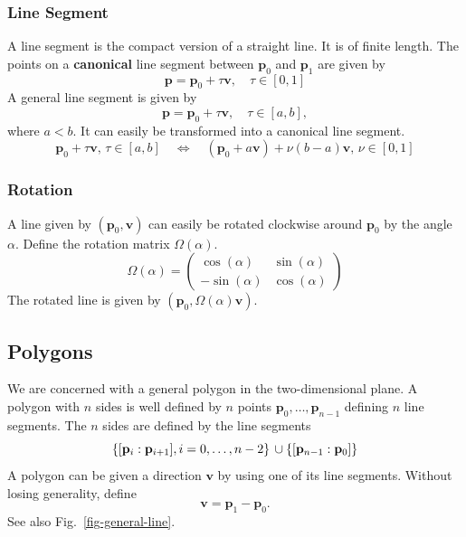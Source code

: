 \documentclass[11pt]{article}
\newcommand{\pb}{\mathbf{p}}
\newcommand{\vb}{\mathbf{v}}
\newcommand{\figref}[1]{Fig.~\eqref{#1}}
\begin{document}
\subsubsection{Line Segment}
\label{sec-line-segment}
A line segment is the compact version of a straight line. It is of finite
length. The points on a {\bf canonical} line segment between $\pb_0$ and
$\pb_1$ are given by
\begin{equation}
    \pb=\pb_0 + \tau \vb,\quad \tau\in[0,1] \label{eq-line-canonical}
\end{equation}
A general line segment is given by
\begin{equation}
    \pb=\pb_0 + \tau \vb,\quad \tau\in[a,b], \label{eq-line-ab}
\end{equation}
where $a<b$. It can easily be transformed into a canonical line segment.
\begin{equation}
    \pb_0+\tau \vb,\,\tau\in [a,b]\quad\Leftrightarrow\quad
    (\pb_0+a\vb) +\nu(b-a) \vb,\,\nu\in [0,1]
\end{equation}


\subsubsection{Rotation}
\label{sec-rotation-line}

A line given by $(\pb_0, \vb)$ can easily be rotated clockwise around
$\pb_0$ by the angle $\alpha$. Define the rotation matrix $\Omega(\alpha)$.
\begin{equation}
    \Omega(\alpha)=\left(
    \begin{matrix}
        \cos(\alpha) & \sin(\alpha) \\
        -\sin(\alpha) & \cos(\alpha)
    \end{matrix}
    \right)\label{eq-rotation-matrix-Omega}
\end{equation}
The rotated line is given by $(\pb_0, \Omega(\alpha)\vb)$.

\subsection{Polygons}
\label{sec-polygons}

We are concerned with a general polygon in the two-dimensional plane. A polygon
with $n$ sides is well defined by $n$ points $\pb_0,\ldots,\pb_{n-1}$
defining $n$ line segments. The $n$ sides are defined by the line segments
\begin{equation}
    \left\{[\pb_i:\pb_{i+1}], i=0,\ldots,n-2\right\}\\
\cup\left\{[\pb_{n-1}:\pb_{0}]\right\}
\end{equation}
A polygon can be given a direction $\vb$  by using one of its line segments.
Without losing generality, define
\begin{equation*}
    \vb=\pb_1-\pb_0.
\end{equation*}
See also \figref{fig-general-line}.
\end{document}
